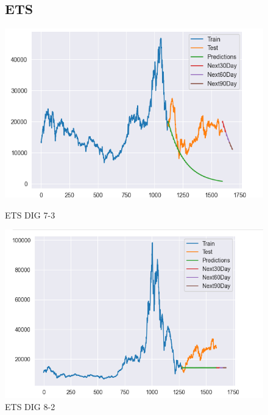 \documentclass[conference]{IEEEtran}
\begin{document}
\begin{figure}[htbp]
\subsection{ETS}
\centering
    \begin{minipage}{0.23\textwidth}
    \centering
    \includegraphics[width=1\textwidth]{experiment/ets/TEAM4_ETS_DIG_7_3.png}
    \caption{ETS DIG 7-3}
    \label{fig:nvl_boxplot}
    \end{minipage}
    \hfill
    \begin{minipage}{0.23\textwidth}
    \centering
    \includegraphics[width=1\textwidth]{experiment/ets/TEAM4_ETS_DIG_8_2.png}
    \caption{ETS DIG 8-2}
    \label{fig:nvl_histogram}
    \end{minipage}
    \begin{minipage}{0.23\textwidth}
    \centering

\end{minipage}
\end{figure}
\end{document}
